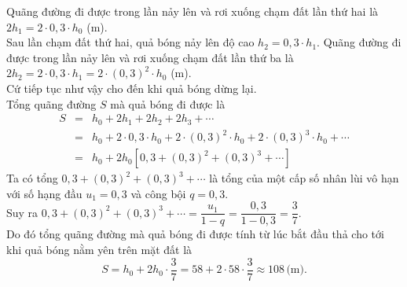 \begin{ex}
{		Quãng đường đi được trong lần nảy lên và rơi xuống chạm đất lần thứ hai là $2h_1 = 2 \cdot 0{,}3 \cdot h_0$ (m).\\
		Sau lần chạm đất thứ hai, quả bóng nảy lên độ cao $h_2 = 0{,}3 \cdot h_1$.
		Quãng đường đi được trong lần nảy lên và rơi xuống chạm đất lần thứ ba là $2h_2 = 2 \cdot 0{,}3 \cdot h_1=2\cdot (0{,}3)^2\cdot h_0$ (m).\\
		Cứ tiếp tục như vậy cho đến khi quả bóng dừng lại.\\
		Tổng quãng đường $S$ mà quả bóng đi được là
		\begin{eqnarray*}
			S&=& h_0+2h_1+2h_2+ 2h_3+\cdots\\
			&=& h_0+2 \cdot 0{,}3 \cdot h_0+2\cdot (0{,}3)^2\cdot h_0 +2\cdot (0{,}3)^3\cdot h_0 +\cdots\\
			&=& h_0 +2h_0\left[0{,}3+ (0{,}3)^2+(0{,}3)^3+\cdots\right]
		\end{eqnarray*}
		Ta có tổng 	$0{,}3+ (0{,}3)^2+(0{,}3)^3+\cdots$	là tổng của một cấp số nhân lùi vô hạn với số hạng đầu $u_1 = 0{,}3$ và công bội $q = 0{,}3$.\\
		Suy ra $0{,}3+ (0{,}3)^2+(0{,}3)^3+\cdots=\dfrac{u_1}{1-q}=\dfrac{0{,}3}{1-0{,}3}=\dfrac{3}{7}$.\\
		Do đó tổng quãng đường mà quả bóng đi được tính từ lúc bắt đầu thả cho tới khi quả bóng nằm yên trên mặt đất là
		\[S=h_0 +2h_0\cdot\dfrac{3}{7}=58+2\cdot58\cdot\dfrac{3}{7} \approx 108\, \text{(m)}.\]
	}
\end{ex}


